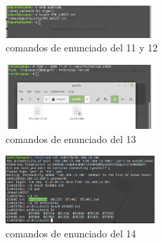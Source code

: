 \documentclass[11pt]{article}
\begin{document}
\begin{figure}[H]
\centering
\includegraphics[width=0.5\textwidth]{img/6.png}
\caption{comandos de enunciado del 11 y 12}
\end{figure}

\begin{figure}[H]
\centering
\includegraphics[width=0.5\textwidth]{img/7.png}
\caption{comandos de enunciado del 13}
\end{figure}

\begin{figure}[H]
\centering
\includegraphics[width=0.5\textwidth]{img/8.png}
\caption{comandos de enunciado del 14}
\end{figure}


\newpage


\end{document}
